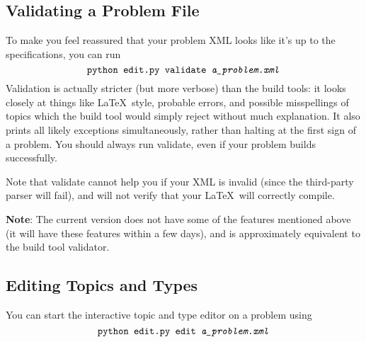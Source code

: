   \subsection{Validating a Problem File}
    To make you feel reassured that your problem XML looks like it's up to the specifications, you can run \[\texttt{python edit.py }\texttt{validate \textit{a\_problem.xml}}\] Validation is actually stricter (but more verbose) than the build tools: it looks closely at things like \LaTeX\ style, probable errors, and possible misspellings of topics which the build tool would simply reject without much explanation. It also prints all likely exceptions simultaneously, rather than halting at the first sign of a problem. You should always run validate, even if your problem builds successfully.
    
    Note that validate cannot help you if your XML is invalid (since the third-party parser will fail), and will not verify that your \LaTeX\ will correctly compile.
    
    \textbf{Note}: The current version does not have some of the features mentioned above (it will have these features within a few days), and is approximately equivalent to the build tool validator.
    
  \subsection{Editing Topics and Types}
    You can start the interactive topic and type editor on a problem using \[\texttt{python edit.py }\texttt{edit \textit{a\_problem.xml}}\]